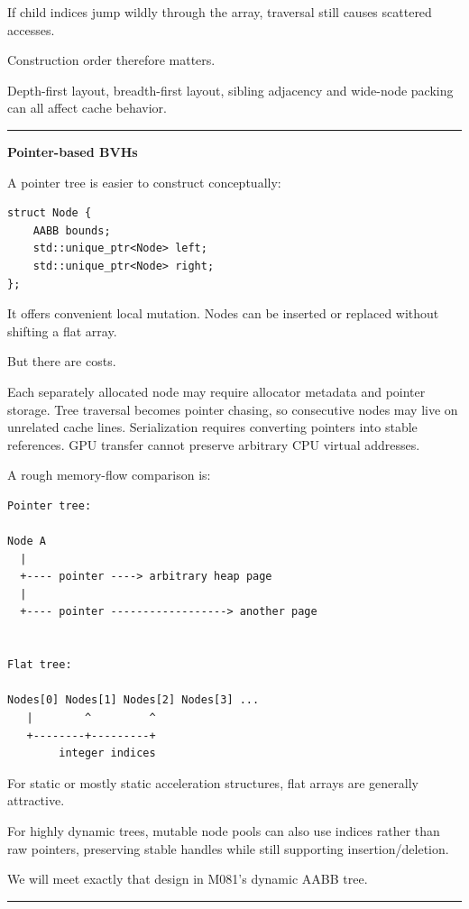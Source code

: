 If child indices jump wildly through the array, traversal still causes scattered accesses.

Construction order therefore matters.

Depth-first layout, breadth-first layout, sibling adjacency and wide-node packing can all affect cache behavior.

\begin{center}\rule{0.5\linewidth}{0.5pt}\end{center}

\textbf{Pointer-based BVHs}

A pointer tree is easier to construct conceptually:

\begin{verbatim}
struct Node {
    AABB bounds;
    std::unique_ptr<Node> left;
    std::unique_ptr<Node> right;
};
\end{verbatim}

It offers convenient local mutation. Nodes can be inserted or replaced without shifting a flat array.

But there are costs.

Each separately allocated node may require allocator metadata and pointer storage. Tree traversal becomes pointer chasing, so consecutive nodes may live on unrelated cache lines. Serialization requires converting pointers into stable references. GPU transfer cannot preserve arbitrary CPU virtual addresses.

A rough memory-flow comparison is:

\begin{verbatim}
Pointer tree:

Node A
  |
  +---- pointer ----> arbitrary heap page
  |
  +---- pointer ------------------> another page


Flat tree:

Nodes[0] Nodes[1] Nodes[2] Nodes[3] ...
   |        ^         ^
   +--------+---------+
        integer indices
\end{verbatim}

For static or mostly static acceleration structures, flat arrays are generally attractive.

For highly dynamic trees, mutable node pools can also use indices rather than raw pointers, preserving stable handles while still supporting insertion/deletion.

We will meet exactly that design in M081's dynamic AABB tree.

\begin{center}\rule{0.5\linewidth}{0.5pt}\end{center}

